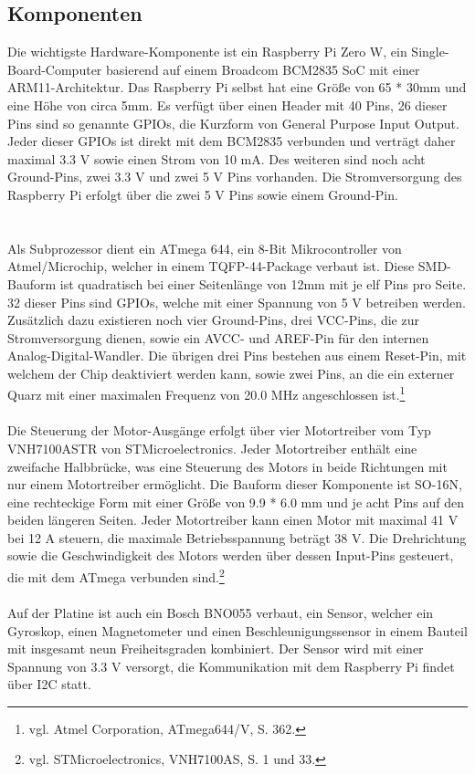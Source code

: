 \documentclass[12pt]{article}
\begin{document}
\subsection{Komponenten}
Die wichtigste Hardware-Komponente ist ein Raspberry Pi Zero W, ein Single-Board-Computer basierend auf einem Broadcom BCM2835 SoC mit einer ARM11-Architektur. Das Raspberry Pi selbst hat eine Größe von 65 * 30mm und eine Höhe von circa 5mm. Es verfügt über einen Header mit 40 Pins, 26 dieser Pins sind so genannte GPIOs, die Kurzform von General Purpose Input Output. Jeder dieser GPIOs ist direkt mit dem BCM2835 verbunden und verträgt daher maximal 3.3 V sowie einen Strom von 10 mA. Des weiteren sind noch acht Ground-Pins, zwei 3.3 V und zwei 5 V Pins vorhanden. Die Stromversorgung des Raspberry Pi erfolgt über die zwei 5 V Pins sowie einem Ground-Pin.
\\\\\\Als Subprozessor dient ein ATmega 644, ein 8-Bit Mikrocontroller von Atmel/Microchip, welcher in einem TQFP-44-Package verbaut ist. Diese SMD-Bauform ist quadratisch bei einer Seitenlänge von 12mm mit je elf Pins pro Seite. 32 dieser Pins sind GPIOs, welche mit einer Spannung von 5 V betreiben werden. Zusätzlich dazu existieren noch vier Ground-Pins, drei VCC-Pins, die zur Stromversorgung dienen, sowie ein AVCC- und AREF-Pin für den internen Analog-Digital-Wandler. Die übrigen drei Pins bestehen aus einem Reset-Pin, mit welchem der Chip deaktiviert werden kann, sowie zwei Pins, an die ein externer Quarz mit einer maximalen Frequenz von 20.0 MHz angeschlossen ist.\footnote{\selectfont vgl. Atmel Corporation, ATmega644/V, S. 362.}
\\\\Die Steuerung der Motor-Ausgänge erfolgt über vier Motortreiber vom Typ VNH7100ASTR von STMicroelectronics. Jeder Motortreiber enthält eine zweifache Halbbrücke, was eine Steuerung des Motors in beide Richtungen mit nur einem Motortreiber ermöglicht. Die Bauform dieser Komponente ist SO-16N, eine rechteckige Form mit einer Größe von 9.9 * 6.0 mm und je acht Pins auf den beiden längeren Seiten. Jeder Motortreiber kann einen Motor mit maximal 41 V bei 12 A steuern, die maximale Betriebsspannung beträgt 38 V. Die Drehrichtung sowie die Geschwindigkeit des Motors werden über dessen Input-Pins gesteuert, die mit dem ATmega verbunden sind.\footnote{\selectfont vgl. STMicroelectronics, VNH7100AS, S. 1 und 33.}
\\\\Auf der Platine ist auch ein Bosch BNO055 verbaut, ein Sensor, welcher ein Gyroskop, einen Magnetometer und einen Beschleunigungssensor in einem Bauteil mit insgesamt neun Freiheitsgraden kombiniert. Der Sensor wird mit einer Spannung von 3.3 V versorgt, die Kommunikation mit dem Raspberry Pi findet über I2C statt. 
\end{document}

